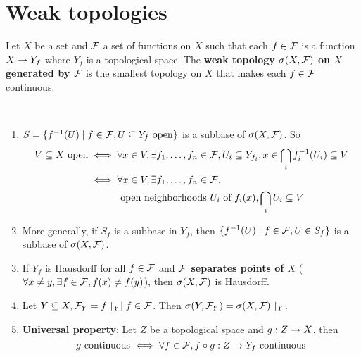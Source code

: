 \documentclass{article}
\begin{document}
\clearpage

\section{Weak topologies}
Let $X$ be a set and $\mathcal F$ a set of functions on $X$ such that each $f \in \mathcal F$ is a function $X \rightarrow Y_f$ where $Y_f$ is a topological space. The {\bf weak topology $\sigma(X, \mathcal F)$ on $X$ generated by $\mathcal F$} is the smallest topology on $X$ that makes each $f \in \mathcal F$ continuous.

\begin{rmks}~
  \begin{enumerate}
    \item $S = \{f^{-1}(U) \mid f \in \mathcal F, U \subseteq Y_f \text{ open}\}$ is a subbase of $\sigma(X, \mathcal F)$. So
    \begin{align*}
      V \subseteq X \text{ open}
      \iff {} & \forall x \in V, \exists f_1, \dots, f_n \in \mathcal F, U_i \subseteq Y_{f_i}, x \in \bigcap_i f_i^{-1}(U_i) \subseteq V \\
      \iff {} & \forall x \in V, \exists f_1, \dots, f_n \in \mathcal F, \\
      & \text{ open neighborhoods } U_i \text{ of } f_i(x), \bigcap_i U_i \subseteq V
    \end{align*}
    \item More generally, if $S_f$ is a subbase in $Y_f$, then $\{f^{-1}(U) \mid f \in \mathcal F, U \in S_f\}$ is a subbase of $\sigma(X, \mathcal F)$.
    \item If $Y_f$ is Hausdorff for all $f \in \mathcal F$ and {\bf $\mathcal F$ separates points of $X$} ($\forall x \ne y, \exists f \in \mathcal F, f(x) \ne f(y)$), then $\sigma(X, \mathcal F)$ is Hausdorff.
    \item Let $Y \subseteq X, \mathcal F_Y = {f\restriction_Y \mid f \in \mathcal F}$. Then $\sigma(Y, \mathcal F_Y) = \sigma(X, \mathcal F)\restriction_Y$.
    \item {\bf Universal property}: Let $Z$ be a topological space and $g : Z \rightarrow X$. then
    $$g \text{ continuous} \iff \forall f \in \mathcal F, f \circ g : Z \rightarrow Y_f \text{ continuous}$$
  \end{enumerate}
\end{rmks}
\end{document}
